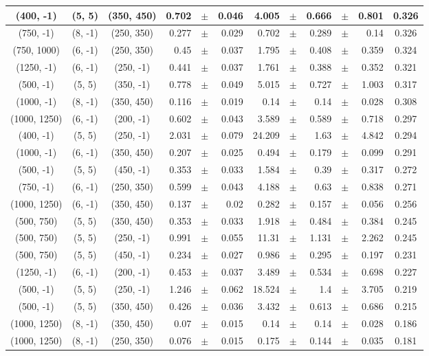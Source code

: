 \documentclass[12pt]{paper}
\begin{document}
\begin{table}[ht]
\begin{center}
{\begin{tabular}{|c|c|c|rrr|rrrrr|c|}
(400, -1)&(5, 5)&(350, 450)&0.702&$\pm$&0.046&4.005&$\pm$&0.666&$\pm$&0.801&0.326\\\hline
(750, -1)&(8, -1)&(250, 350)&0.277&$\pm$&0.029&0.702&$\pm$&0.289&$\pm$&0.14&0.326\\\hline
(750, 1000)&(6, -1)&(250, 350)&0.45&$\pm$&0.037&1.795&$\pm$&0.408&$\pm$&0.359&0.324\\\hline
(1250, -1)&(6, -1)&(250, -1)&0.441&$\pm$&0.037&1.761&$\pm$&0.388&$\pm$&0.352&0.321\\\hline
(500, -1)&(5, 5)&(350, -1)&0.778&$\pm$&0.049&5.015&$\pm$&0.727&$\pm$&1.003&0.317\\\hline
(1000, -1)&(8, -1)&(350, 450)&0.116&$\pm$&0.019&0.14&$\pm$&0.14&$\pm$&0.028&0.308\\\hline
(1000, 1250)&(6, -1)&(200, -1)&0.602&$\pm$&0.043&3.589&$\pm$&0.589&$\pm$&0.718&0.297\\\hline
(400, -1)&(5, 5)&(250, -1)&2.031&$\pm$&0.079&24.209&$\pm$&1.63&$\pm$&4.842&0.294\\\hline
(1000, -1)&(6, -1)&(350, 450)&0.207&$\pm$&0.025&0.494&$\pm$&0.179&$\pm$&0.099&0.291\\\hline
(500, -1)&(5, 5)&(450, -1)&0.353&$\pm$&0.033&1.584&$\pm$&0.39&$\pm$&0.317&0.272\\\hline
(750, -1)&(6, -1)&(250, 350)&0.599&$\pm$&0.043&4.188&$\pm$&0.63&$\pm$&0.838&0.271\\\hline
(1000, 1250)&(6, -1)&(350, 450)&0.137&$\pm$&0.02&0.282&$\pm$&0.157&$\pm$&0.056&0.256\\\hline
(500, 750)&(5, 5)&(350, 450)&0.353&$\pm$&0.033&1.918&$\pm$&0.484&$\pm$&0.384&0.245\\\hline
(500, 750)&(5, 5)&(250, -1)&0.991&$\pm$&0.055&11.31&$\pm$&1.131&$\pm$&2.262&0.245\\\hline
(500, 750)&(5, 5)&(450, -1)&0.234&$\pm$&0.027&0.986&$\pm$&0.295&$\pm$&0.197&0.231\\\hline
(1250, -1)&(6, -1)&(200, -1)&0.453&$\pm$&0.037&3.489&$\pm$&0.534&$\pm$&0.698&0.227\\\hline
(500, -1)&(5, 5)&(250, -1)&1.246&$\pm$&0.062&18.524&$\pm$&1.4&$\pm$&3.705&0.219\\\hline
(500, -1)&(5, 5)&(350, 450)&0.426&$\pm$&0.036&3.432&$\pm$&0.613&$\pm$&0.686&0.215\\\hline
(1000, 1250)&(8, -1)&(350, 450)&0.07&$\pm$&0.015&0.14&$\pm$&0.14&$\pm$&0.028&0.186\\\hline
(1000, 1250)&(8, -1)&(250, 350)&0.076&$\pm$&0.015&0.175&$\pm$&0.144&$\pm$&0.035&0.181\\\hline

\end{tabular}}
\end{center}
\end{table}
\end{document}
